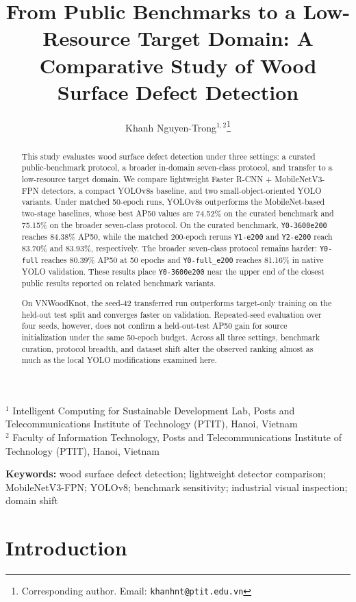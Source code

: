 \documentclass[10pt,a4paper]{article}
\title{From Public Benchmarks to a Low-Resource Target Domain: A Comparative Study of Wood Surface Defect Detection}
\author{
  Khanh Nguyen-Trong$^{1,2}$\thanks{Corresponding author. Email: \texttt{khanhnt@ptit.edu.vn}}
}
\date{}
\begin{document}
\maketitle

\begin{center}
\small
$^{1}$ Intelligent Computing for Sustainable Development Lab, Posts and Telecommunications Institute of Technology (PTIT), Hanoi, Vietnam \\
$^{2}$ Faculty of Information Technology, Posts and Telecommunications Institute of Technology (PTIT), Hanoi, Vietnam
\end{center}

\begin{abstract}
This study evaluates wood surface defect detection under three settings: a curated public-benchmark protocol, a broader in-domain seven-class protocol, and transfer to a low-resource target domain. We compare lightweight Faster R-CNN + MobileNetV3-FPN detectors, a compact YOLOv8s baseline, and two small-object-oriented YOLO variants. Under matched 50-epoch runs, YOLOv8s outperforms the MobileNet-based two-stage baselines, whose best AP50 values are 74.52\% on the curated benchmark and 75.15\% on the broader seven-class protocol. On the curated benchmark, \texttt{Y0-3600e200} reaches 84.38\% AP50, while the matched 200-epoch reruns \texttt{Y1-e200} and \texttt{Y2-e200} reach 83.70\% and 83.93\%, respectively. The broader seven-class protocol remains harder: \texttt{Y0-full} reaches 80.39\% AP50 at 50 epochs and \texttt{Y0-full\_e200} reaches 81.16\% in native YOLO validation. These results place \texttt{Y0-3600e200} near the upper end of the closest public results reported on related benchmark variants.

On VNWoodKnot, the seed-42 transferred run outperforms target-only training on the held-out test split and converges faster on validation. Repeated-seed evaluation over four seeds, however, does not confirm a held-out-test AP50 gain for source initialization under the same 50-epoch budget. Across all three settings, benchmark curation, protocol breadth, and dataset shift alter the observed ranking almost as much as the local YOLO modifications examined here.
\end{abstract}

\noindent\textbf{Keywords:} wood surface defect detection; lightweight detector comparison; MobileNetV3-FPN; YOLOv8; benchmark sensitivity; industrial visual inspection; domain shift

\section{Introduction}
\label{sec:introduction}
\end{document}
